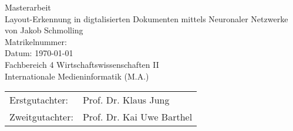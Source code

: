 \begin{titlepage}
    \vspace*{\baselineskip}
    \vspace*{0.167\textheight} 
    Masterarbeit\\
    \vspace{\baselineskip}
    {\huge Layout-Erkennung in digtalisierten Dokumenten mittels Neuronaler Netzwerke}\\
    \vspace{\baselineskip}
    von Jakob Schmolling\\
    \vfill
    Matrikelnummer:\\
    \vspace{\baselineskip}
    Datum: \today \\
    \vspace{\baselineskip}
    Fachbereich 4 Wirtschaftswissenschaften II\\
    Internationale Medieninformatik (M.A.)\\
    \vspace{\baselineskip}
    \begin{tabular}{@{\hspace{0em}}ll}
    Erstgutachter: & Prof. Dr. Klaus Jung\\
    Zweitgutachter: & Prof. Dr. Kai Uwe Barthel\\
    \end{tabular}
\end{titlepage}


